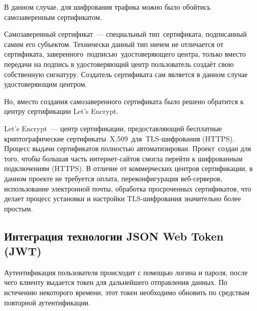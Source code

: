 \documentclass[14pt, a4paper]{extarticle}
\begin{document}
    В данном случае, для шифрования трафика можно было обойтись самозаверенным сертификатом.

    Самозаверенный сертификат — специальный тип сертификата, подписанный самим его субъектом. Технически данный тип ничем не отличается от сертификата, заверенного подписью удостоверяющего центра, только вместо передачи на подпись в удостоверяющий центр пользователь создаёт свою собственную сигнатуру. Создатель сертификата сам является в данном случае удостоверяющим центром.

    Но, вместо создания самозаверенного сертификата было решено обратится к центру сертификации Let’s Encrypt.

    Let’s Encrypt — центр сертификации, предоставляющий бесплатные криптографические сертификаты X.509 для TLS-шифрования (HTTPS). Процесс выдачи сертификатов полностью автоматизирован. Проект создан для того, чтобы большая часть интернет-сайтов смогла перейти к шифрованным подключениям (HTTPS). В отличие от коммерческих центров сертификации, в данном проекте не требуется оплата, переконфигурация веб-серверов, использование электронной почты, обработка просроченных сертификатов, что делает процесс установки и настройки TLS-шифрования значительно более простым.


    \newpage
    \subsection{Интеграция технологии JSON Web Token (JWT)}
    Аутентификация пользователя происходит с помощью логина и пароля, после чего клиенту выдается токен для дальнейшего отправления данных. По истечению некоторого времени, этот токен необходимо обновить по средствам повторной аутентификации.
\end{document}
